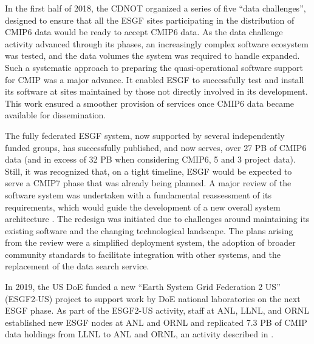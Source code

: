 \documentclass[manuscript]{copernicus}
\def\cred#1{{\color{red}#1}}
\begin{document}
In the first half of 2018, the CDNOT organized a series of five ``data challenges'', designed to ensure that all the ESGF sites participating in the distribution of CMIP6 data would be ready to accept CMIP6 data. As the data challenge activity advanced through its phases, an increasingly complex software ecosystem was tested, and the data volumes the system was required to handle expanded. Such a systematic approach to preparing the quasi-operational software support for CMIP was a major advance. It enabled ESGF to successfully test and install its software at sites maintained by those not directly involved in its development. This work ensured a smoother provision of services once CMIP6 data became available for dissemination.

The fully federated ESGF system, now supported by several independently funded groups, has successfully published, and now serves, over 27 PB of CMIP6 data (and in excess of 32 PB when considering CMIP6, 5 and 3 project data). Still, it was recognized that, on a tight timeline, ESGF would be expected to serve a CMIP7 phase that was already being planned. A major review of the software system was undertaken with a fundamental reassessment of its requirements, which would guide the development of a new overall system architecture \citep{kershaw_esgf_2020}. The redesign was initiated due to challenges around maintaining its existing software and the changing technological landscape. The plans arising from the review were a simplified deployment system, the adoption of broader community standards to facilitate integration with other systems, and the replacement of the data search service.

In 2019, the US DoE funded a new ``Earth System Grid Federation 2 US'' (ESGF2-US) project to support work by DoE national laboratories on the next ESGF phase. As part of the ESGF2-US activity, staff at ANL, LLNL, and ORNL established new ESGF nodes at ANL and ORNL and replicated 7.3 PB of CMIP data holdings from LLNL to ANL and ORNL, an activity described in \cite{lacinski_automated_2024}.


\end{document}
